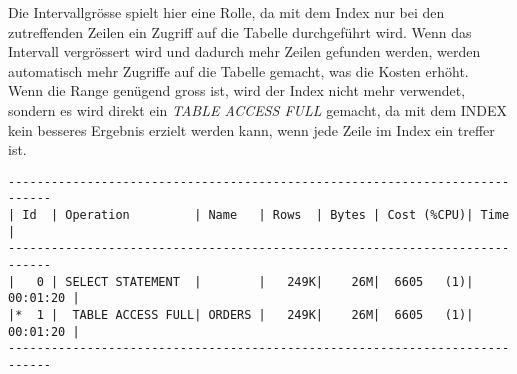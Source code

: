 \documentclass[11pt,a4paper,parskip=half]{scrartcl}
\begin{document}
Die Intervallgrösse spielt hier eine Rolle, da mit dem Index nur bei den zutreffenden Zeilen ein Zugriff auf die Tabelle durchgeführt wird. Wenn das Intervall vergrössert wird und dadurch mehr Zeilen gefunden werden, werden automatisch mehr Zugriffe auf die Tabelle gemacht, was die Kosten erhöht.\\
Wenn die Range genügend gross ist, wird der Index nicht mehr verwendet, sondern es wird direkt ein \emph{TABLE ACCESS FULL} gemacht, da mit dem INDEX kein besseres Ergebnis erzielt werden kann, wenn jede Zeile im Index ein treffer ist.
\begin{lstlisting}
----------------------------------------------------------------------------                                                                                                                                                                                                                                 
| Id  | Operation         | Name   | Rows  | Bytes | Cost (%CPU)| Time     |                                                                                                                                                                                                                                 
----------------------------------------------------------------------------                                                                                                                                                                                                                                 
|   0 | SELECT STATEMENT  |        |   249K|    26M|  6605   (1)| 00:01:20 |                                                                                                                                                                                                                                 
|*  1 |  TABLE ACCESS FULL| ORDERS |   249K|    26M|  6605   (1)| 00:01:20 |                                                                                                                                                                                                                                 
----------------------------------------------------------------------------                                                                                                                                                                                                                                 
                                                                                                                                                                                                                                                                                                             

\end{lstlisting}
\end{document}
